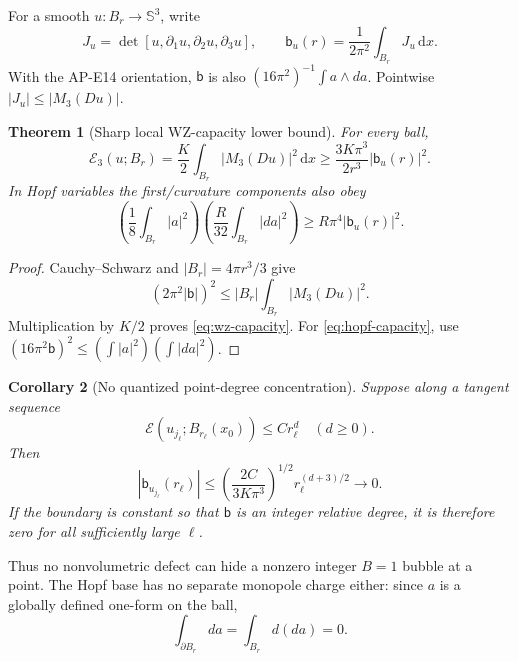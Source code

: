 \documentclass[10pt]{article}
\newtheorem{theorem}{Theorem}[section]
\newtheorem{corollary}[theorem]{Corollary}
\newcommand{\dd}{\,\mathrm d}
\newcommand{\SSS}{\mathbb S}
\newcommand{\cE}{\mathcal E}
\begin{document}
For a smooth $u:B_r\to\SSS^3$, write
\begin{equation}
 J_u=\det[u,\partial_1u,\partial_2u,\partial_3u],\qquad
 \mathsf b_u(r)=\frac1{2\pi^2}\int_{B_r}J_u\dd x.        \label{eq:b}
\end{equation}
With the AP-E14 orientation, $\mathsf b$ is also
$(16\pi^2)^{-1}\int a\wedge da$.  Pointwise
$|J_u|\leq|M_3(Du)|$.

\begin{theorem}[Sharp local WZ-capacity lower bound]
For every ball,
\begin{equation}
 \boxed{\;
 \cE_3(u;B_r)=\frac K2\int_{B_r}|M_3(Du)|^2\dd x
 \geq\frac{3K\pi^3}{2r^3}|\mathsf b_u(r)|^2 .\;}
 \label{eq:wz-capacity}
\end{equation}
In Hopf variables the first/curvature components also obey
\begin{equation}
 \left(\frac18\int_{B_r}|a|^2\right)
 \left(\frac R{32}\int_{B_r}|da|^2\right)
 \geq R\pi^4|\mathsf b_u(r)|^2.                         \label{eq:hopf-capacity}
\end{equation}
\end{theorem}

\begin{proof}
Cauchy--Schwarz and $|B_r|=4\pi r^3/3$ give
\[
 (2\pi^2|\mathsf b|)^2
 \leq |B_r|\int_{B_r}|M_3(Du)|^2.
\]
Multiplication by $K/2$ proves \eqref{eq:wz-capacity}.
For \eqref{eq:hopf-capacity}, use
$(16\pi^2\mathsf b)^2\leq
(\int|a|^2)(\int|da|^2)$.
\end{proof}

\begin{corollary}[No quantized point-degree concentration]
Suppose along a tangent sequence
\begin{equation}
 \cE(u_{j_\ell};B_{r_\ell}(x_0))\leq Cr_\ell^d
 \quad(d\geq0).
 \label{eq:dscale}
\end{equation}
Then
\begin{equation}
 |\mathsf b_{u_{j_\ell}}(r_\ell)|
 \leq\left(\frac{2C}{3K\pi^3}\right)^{1/2}
 r_\ell^{(d+3)/2}\longrightarrow0.                     \label{eq:bdecay}
\end{equation}
If the boundary is constant so that $\mathsf b$ is an integer relative
degree, it is therefore zero for all sufficiently large $\ell$.
\end{corollary}

Thus no nonvolumetric defect can hide a nonzero integer $B=1$ bubble at a
point.  The Hopf base has no separate monopole charge either: since $a$ is a
globally defined one-form on the ball,
\begin{equation}
 \int_{\partial B_r}da=\int_{B_r}d(da)=0.               \label{eq:no-monopole}
\end{equation}
\end{document}
